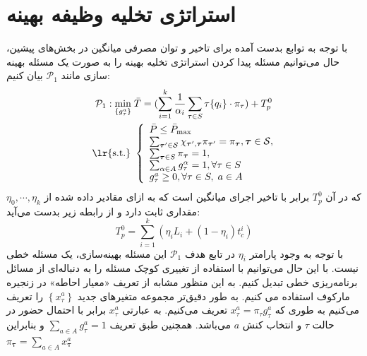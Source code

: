 \section{استراتژی تخلیه وظیفه بهینه}
با توجه به توابع بدست آمده برای تاخیر و توان مصرفی میانگین در بخش‌های پیشین، حال می‌توانیم مسئله پیدا کردن استراتژی تخلیه بهینه را به صورت یک مسئله بهینه سازی مانند
$\mathcal{P}_{1}$
بیان کنیم:
\begin{equation}
		\begin{aligned}
			\mathcal{P}_{1}: \min _{\left\{g_{\tau}^{a}\right\}}\; & \bar{T} = (\sum_{i=1}^{k} \frac{1}{\alpha_i} \sum_{\tau \in S} \tau\{q_i\} \cdot \pi_{\tau}) + T_p^0 \\
			\text { \lr{s.t.} } &\left\{\begin{array}{l}
				\bar{P} \leq \bar{P}_{\max } \\
				\sum_{\boldsymbol{\tau}^{\prime} \in \mathcal{S}} \chi_{\boldsymbol{\tau}^{\prime}, \boldsymbol{\tau}} \pi_{\boldsymbol{\tau}^{\prime}}=\pi_{\boldsymbol{\tau}}, \boldsymbol{\tau} \in \mathcal{S}, \\
				\sum_{\boldsymbol{\tau} \in S} \pi_{\boldsymbol{\tau}}=1, \\
				\sum_{\alpha \in A} g_{\tau}^{\alpha}=1, \forall \tau \in S\\
				g_{\tau}^{a} \geq 0, \forall \tau \in S,\;a \in A
			\end{array}\right.
		\end{aligned}
\end{equation}
که در آن
$T_p^0$
برابر با تاخیر اجرای میانگین است که به ازای مقادیر داده شده از
$\eta_0, \cdots, \eta_k$
مقداری ثابت دارد و از رابطه زیر بدست می‌آید:
\begin{equation}
	T_p^0 = \sum_{i=1}^{k} (\eta_i L_i+(1-\eta_i) t_{c}^i)
\end{equation}
\clearpage
با توجه به وجود پارامتر $\eta_i$ در تابع هدف
$\mathcal{P}_{1}$
این مسئله بهینه‌سازی، یک مسئله خطی نیست. با این حال می‌توانیم با استفاده از تغییری کوچک مسئله را به دنباله‌ای از مسائل برنامه‌ریزی خطی تبدیل کنیم. به این منظور مشابه \cite{Liu} از تعریف «معیار احاطه» در زنجیره مارکوف استفاده می کنیم. به طور دقیق‌تر مجموعه متغیرهای جدید $\left\{x_{\tau}^{a}\right\}$ را تعریف می‌کنیم به طوری که  $x_{\tau}^{a}=\pi_{\tau} g_{\tau}^{a}$ تعریف می‌کنیم. به عبارتی $x_{\tau}^{a}$ برابر با احتمال حضور در حالت $\tau$ و انتخاب کنش
$a$
می‌باشد. همچنین طبق تعریف 
$\sum_{a \in A} g_{\tau}^{a}=1$
و بنابراین
$\pi_{\boldsymbol{\tau}}=\sum_{a \in A} x_{\boldsymbol{\tau}}^{a}$
\\\\
